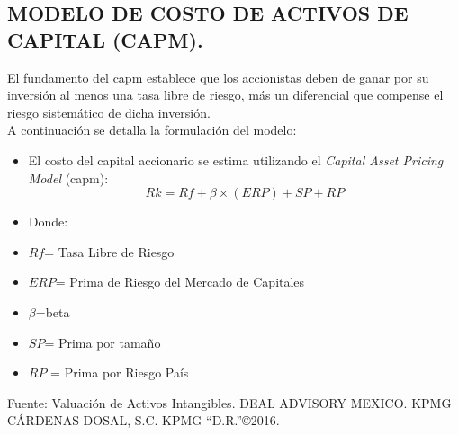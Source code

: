 \begin{rightcolumn}

\section{MODELO DE COSTO DE ACTIVOS DE CAPITAL (CAPM).} 

El fundamento del \gls{capm} establece que los accionistas deben de ganar por su inversi\'on al menos una tasa libre de riesgo, m\'as un diferencial que compense el riesgo sistem\'atico de dicha inversi\'on.\\[10pt]

A continuaci\'on se detalla la formulaci\'on del modelo:


\begin{center}
\begin{minipage}{8cm}
\begin{itemize}
\small
				\item El costo del capital accionario se estima utilizando el \textit{Capital Asset Pricing Model} (\gls{capm}):
				$$Rk=Rf+\beta\times(ERP)+SP+RP$$
				 \item Donde:
				 \item $Rf$= Tasa Libre de Riesgo
				 \item $ERP$= Prima de Riesgo del Mercado de Capitales
				 \item $\beta$=\gls{beta}
				 \item $SP$= Prima por tama\~no
				 \item $RP$ = Prima por Riesgo Pa\'is
			\end{itemize}
	\footnotesize{Fuente: Valuaci\'on de Activos Intangibles. DEAL ADVISORY MEXICO. KPMG C\'ARDENAS DOSAL, S.C. KPMG ``D.R.''\copyright 2016.}
		\end{minipage}
\end{center}

\end{rightcolumn}
